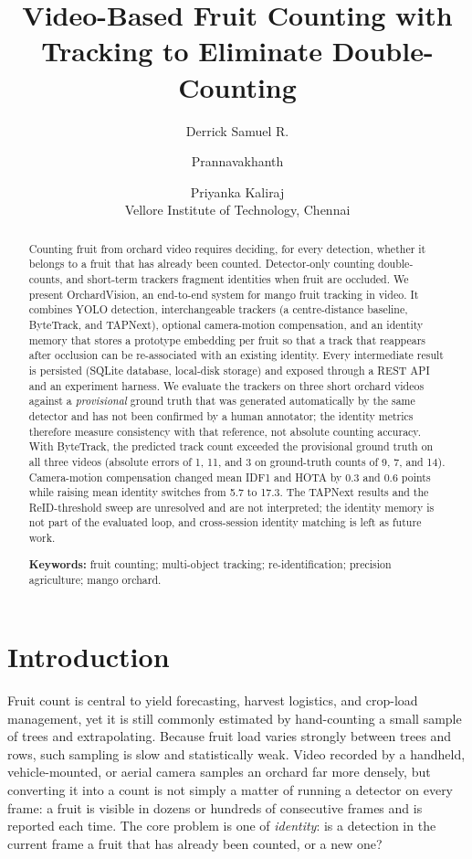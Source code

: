 \documentclass[11pt]{article}
\title{Video-Based Fruit Counting with Tracking to Eliminate Double-Counting}
\author{Derrick Samuel R. \and Prannavakhanth \and Priyanka Kaliraj \\
Vellore Institute of Technology, Chennai}
\date{}
\begin{document}
\maketitle

\begin{abstract}
Counting fruit from orchard video requires deciding, for every detection, whether it belongs to a fruit that has already been counted. Detector-only counting double-counts, and short-term trackers fragment identities when fruit are occluded. We present OrchardVision, an end-to-end system for mango fruit tracking in video. It combines YOLO detection, interchangeable trackers (a centre-distance baseline, ByteTrack, and TAPNext), optional camera-motion compensation, and an identity memory that stores a prototype embedding per fruit so that a track that reappears after occlusion can be re-associated with an existing identity. Every intermediate result is persisted (SQLite database, local-disk storage) and exposed through a REST API and an experiment harness. We evaluate the trackers on three short orchard videos against a \emph{provisional} ground truth that was generated automatically by the same detector and has not been confirmed by a human annotator; the identity metrics therefore measure consistency with that reference, not absolute counting accuracy. With ByteTrack, the predicted track count exceeded the provisional ground truth on all three videos (absolute errors of 1, 11, and 3 on ground-truth counts of 9, 7, and 14). Camera-motion compensation changed mean IDF1 and HOTA by 0.3 and 0.6 points while raising mean identity switches from 5.7 to 17.3. The TAPNext results and the ReID-threshold sweep are unresolved and are not interpreted; the identity memory is not part of the evaluated loop, and cross-session identity matching is left as future work.

\medskip
\noindent\textbf{Keywords:} fruit counting; multi-object tracking; re-identification; precision agriculture; mango orchard.
\end{abstract}

\section{Introduction}

Fruit count is central to yield forecasting, harvest logistics, and crop-load management, yet it is still commonly estimated by hand-counting a small sample of trees and extrapolating. Because fruit load varies strongly between trees and rows, such sampling is slow and statistically weak. Video recorded by a handheld, vehicle-mounted, or aerial camera samples an orchard far more densely, but converting it into a count is not simply a matter of running a detector on every frame: a fruit is visible in dozens or hundreds of consecutive frames and is reported each time. The core problem is one of \emph{identity}: is a detection in the current frame a fruit that has already been counted, or a new one?
\end{document}
